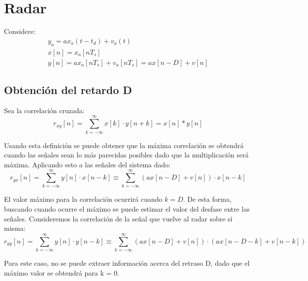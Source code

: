\section{Radar}
	Considere:
	\begin{align}
		y_{a} = ax_{a}(t-t_{d}) + v_{a}(t) \\
		x[n] = x_{a}[nT_{s}] \\
		y[n] = ax_{a}[nT_{s}] + v_{a}[nT_{s}] = ax[n-D] + v[n]
	\end{align}
	\subsection{Obtención del retardo D}
		Sea la correlación cruzada:
		\begin{equation}
			r_{xy}[n] = \sum_{k=-\infty}^{\infty} x[k] \cdot y[n+k] = x[n]*y[n]
		\end{equation}
		
		Usando esta definición se puede obtener que la máxima correlación se obtendrá cuando las señales sean lo más parecidas posibles dado que la multiplicación será máxima. Aplicando esto a las señales del sistema dado:
		\begin{equation}
			r_{yx}[n] = \sum_{k=-\infty}^{\infty} y[n] \cdot x[n-k]  \equiv \sum_{k=-\infty}^{\infty} \left( ax[n-D] + v[n] \right)  \cdot x[n-k] 
		\end{equation}
		
		El valor máximo para la correlación ocurrirá cuando $k = D$. De esta forma, buscando cuando ocurre el máximo se puede estimar el valor del desfase entre las señales. Consideremos la correlación de la señal que vuelve al radar sobre sí misma:
		\begin{equation}
			r_{yy}[n] = \sum_{k=-\infty}^{\infty} y[n] \cdot y[n-k]  \equiv \sum_{k=-\infty}^{\infty} \left( ax[n-D] + v[n] \right)  \cdot \left( ax[n-D-k] + v[n-k] \right)
		\end{equation}
		
		Para este caso, no se puede extraer información acerca del retraso D, dado que el máximo valor se obtendrá para k = 0.
